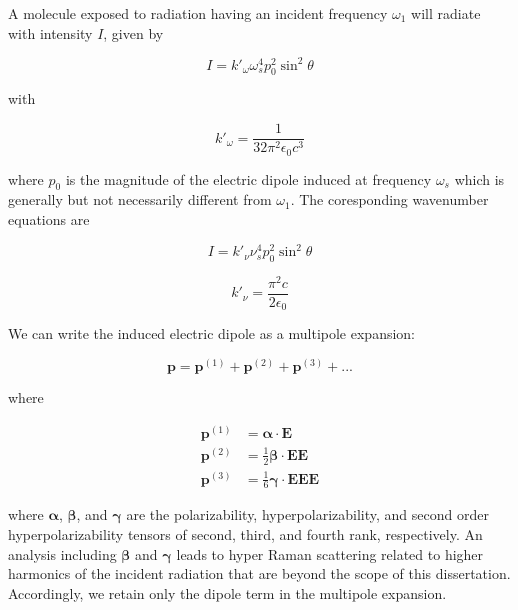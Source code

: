 A molecule exposed to radiation having an incident frequency $\omega_{1}$ will radiate with intensity $I$, given by

\begin{equation}
I = k'_{\omega} \omega_{s}^{4} p_{0}^{2} \sin^{2} \theta
\end{equation}

with

\begin{equation}
k'_{\omega} = \frac{1}{32 \pi^{2} \epsilon_{0} c^{3}}
\end{equation}

where $p_{0}$ is the magnitude of the electric dipole induced at frequency $\omega_{s}$ which is generally but not necessarily different from $\omega_{1}$. The coresponding wavenumber equations are

\begin{equation}
I = k'_{\nu} \nu_{s}^{4} p_{0}^{2} \sin^{2} \theta
\end{equation}

\begin{equation}
k'_{\nu} = \frac{\pi^{2} c}{2 \epsilon_{0}}
\end{equation}

We can write the induced electric dipole as a multipole expansion:

\begin{equation}
\mathbf{p} = \mathbf{p}^{(1)} + \mathbf{p}^{(2)} + \mathbf{p}^{(3)} + ...
\end{equation}

where

\begin{equation}
\begin{aligned}
	\mathbf{p}^{(1)} &= \boldsymbol{\alpha} \cdot \mathbf{E} \\
	\mathbf{p}^{(2)} &= \frac{1}{2} \boldsymbol{\beta} \cdot \mathbf{E} \mathbf{E} \\
	\mathbf{p}^{(3)} &= \frac{1}{6} \boldsymbol{\gamma} \cdot \mathbf{E} \mathbf{E} \mathbf{E}
\end{aligned}
\end{equation}
	
where $\boldsymbol{\alpha}$, $\boldsymbol{\beta}$, and $\boldsymbol{\gamma}$ are the polarizability, hyperpolarizability, and second order hyperpolarizability tensors of second, third, and fourth rank, respectively. An analysis including $\boldsymbol{\beta}$ and $\boldsymbol{\gamma}$ leads to hyper Raman scattering related to higher harmonics of the incident radiation that are beyond the scope of this dissertation. Accordingly, we retain only the dipole term in the multipole expansion.

